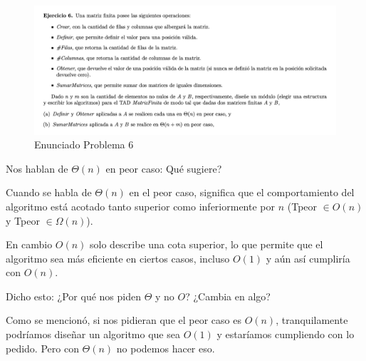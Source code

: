 \documentclass[10pt,a4paper]{article}
\begin{document}
\begin{figure}[h]
  \centering
  \includegraphics[width=\textwidth]{images/guia_8_ej_6.png}
  \caption{Enunciado Problema 6}
  \label{fig:ej_6}
\end{figure}

\par Nos hablan de \ensuremath{\Theta(n)} en peor caso: Qué sugiere?
\par Cuando se habla de \ensuremath{\Theta(n)} en el peor caso, significa que el comportamiento del algoritmo está acotado tanto superior como inferiormente por \ensuremath{n} (Tpeor \ensuremath{\in O(n)} y Tpeor \ensuremath{\in \Omega(n)}).
\par En cambio \ensuremath{O(n)} solo describe una cota superior, lo que permite que el algoritmo sea más eficiente en ciertos casos, incluso 
\ensuremath{O(1)} y aún así cumpliría con \ensuremath{O(n)}.
\par Dicho esto: ¿Por qué nos piden \ensuremath{\Theta} y no \ensuremath{O}? ¿Cambia en algo?
\par Como se mencionó, si nos pidieran que el peor caso es \ensuremath{O(n)}, tranquilamente podríamos diseñar un algoritmo que sea \ensuremath{O(1)} y estaríamos cumpliendo con lo pedido. Pero con \ensuremath{\Theta(n)} no podemos hacer eso.
\end{document}

